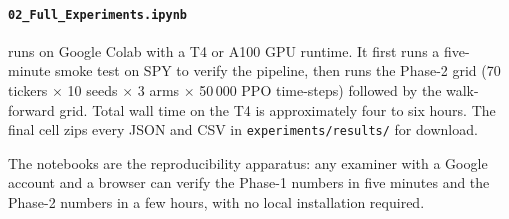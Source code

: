 \paragraph{\texttt{02\_Full\_Experiments.ipynb}} runs on Google Colab with a T4 or A100 GPU runtime. It first runs a five-minute smoke test on SPY to verify the pipeline, then runs the Phase-2 grid (70 tickers $\times$ 10 seeds $\times$ 3 arms $\times$ 50\,000 PPO time-steps) followed by the walk-forward grid. Total wall time on the T4 is approximately four to six hours. The final cell zips every JSON and CSV in \texttt{experiments/results/} for download.

The notebooks are the reproducibility apparatus: any examiner with a Google account and a browser can verify the Phase-1 numbers in five minutes and the Phase-2 numbers in a few hours, with no local installation required.
